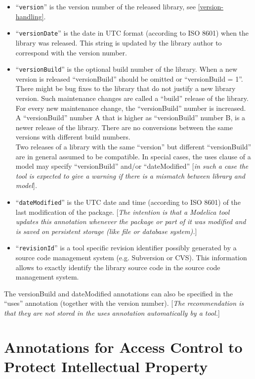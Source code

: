 \begin{itemize}
\item
  ``\lstinline!version!'' is the version number of the released library,
  see \autoref{version-handling}.
\item
  ``\lstinline!versionDate!'' is the date in UTC format (according to ISO
  8601) when the library was released. This string is updated by the
  library author to correspond with the version number.
\item
  ``\lstinline!versionBuild!'' is the optional build number of the library.
  When a new version is released ``versionBuild'' should be omitted or
  ``versionBuild = 1''. There might be bug fixes to the library that do
  not justify a new library version. Such maintenance changes are called
  a ``build'' release of the library. For every new maintenance change,
  the ``versionBuild'' number is increased. A ``versionBuild'' number A
  that is higher as ``versionBuild'' number B, is a newer release of the
  library. There are no conversions between the same versions with
  different build numbers. \emph{\\
  }Two releases of a library with the same ``version'' but different
  ``versionBuild'' are in general assumed to be compatible. In special
  cases, the uses clause of a model may specify ``versionBuild'' and/or
  ``dateModified'' {[}\emph{in such a case the tool is expected to give
  a warning if there is a mismatch between library and model}{]}\emph{.}
\item
  ``\lstinline!dateModified!'' is the UTC date and time (according to ISO
  8601) of the last modification of the package. {[}\emph{The intention
  is that a Modelica tool updates this annotation whenever the package
  or part of it was modified and is saved on persistent storage (like
  file or database system).}{]}
\item
  ``\lstinline!revisionId!'' is a tool specific revision identifier
  possibly generated by a source code management system (e.g. Subversion
  or CVS). This information allows to exactly identify the library
  source code in the source code management system.
\end{itemize}

The versionBuild and dateModified annotations can also be specified in
the ``uses'' annotation (together with the version number). {[}\emph{The
recommendation is that they are not stored in the uses annotation
automatically by a tool.}{]}

\section{Annotations for Access Control to Protect Intellectual Property}

